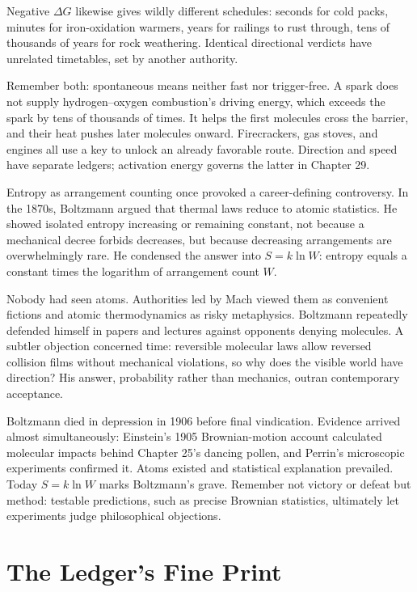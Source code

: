 Negative $\Delta G$ likewise gives wildly different schedules: seconds for cold packs, minutes for iron-oxidation warmers, years for railings to rust through, tens of thousands of years for rock weathering. Identical directional verdicts have unrelated timetables, set by another authority.

Remember both: spontaneous means neither fast nor trigger-free. A spark does not supply hydrogen--oxygen combustion's driving energy, which exceeds the spark by tens of thousands of times. It helps the first molecules cross the barrier, and their heat pushes later molecules onward. Firecrackers, gas stoves, and engines all use a key to unlock an already favorable route. Direction and speed have separate ledgers; activation energy governs the latter in Chapter 29.

\begin{zhengju}
Entropy as arrangement counting once provoked a career-defining controversy. In the 1870s, Boltzmann argued that thermal laws reduce to atomic statistics. He showed isolated entropy increasing or remaining constant, not because a mechanical decree forbids decreases, but because decreasing arrangements are overwhelmingly rare. He condensed the answer into $S=k\ln W$: entropy equals a constant times the logarithm of arrangement count $W$.

Nobody had seen atoms. Authorities led by Mach viewed them as convenient fictions and atomic thermodynamics as risky metaphysics. Boltzmann repeatedly defended himself in papers and lectures against opponents denying molecules. A subtler objection concerned time: reversible molecular laws allow reversed collision films without mechanical violations, so why does the visible world have direction? His answer, probability rather than mechanics, outran contemporary acceptance.

Boltzmann died in depression in 1906 before final vindication. Evidence arrived almost simultaneously: Einstein's 1905 Brownian-motion account calculated molecular impacts behind Chapter 25's dancing pollen, and Perrin's microscopic experiments confirmed it. Atoms existed and statistical explanation prevailed. Today $S=k\ln W$ marks Boltzmann's grave. Remember not victory or defeat but method: testable predictions, such as precise Brownian statistics, ultimately let experiments judge philosophical objections.
\end{zhengju}

\section{The Ledger's Fine Print}

